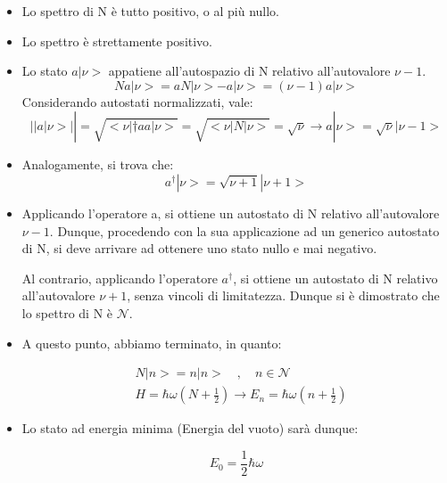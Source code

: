 \documentclass{article}
\begin{document}
\begin{itemize}
    \item Lo spettro di N è tutto positivo, o al più nullo.
    \item Lo spettro è strettamente positivo.
    \item Lo stato $a|\nu>$ appatiene all'autospazio di N relativo all'autovalore $\nu-1$.
          \begin{equation}
              Na|\nu>=aN|\nu>-a|\nu>=(\nu-1)a|\nu>
          \end{equation}
          Considerando autostati normalizzati, vale:
          \begin{equation}
              ||a|\nu>||= \sqrt{<\nu|\dagger a a|\nu>}=\sqrt{<\nu|N|\nu>}=\sqrt{\nu} \rightarrow a|\nu>=\sqrt{\nu}|\nu-1>
          \end{equation}
    \item Analogamente, si trova che:
          \begin{equation}
              a^{\dagger}|\nu>=\sqrt{\nu+1}|\nu+1>
          \end{equation}
    \item Applicando l'operatore a, si ottiene un autostato di N relativo all'autovalore $\nu-1$. Dunque,
          procedendo con la sua applicazione ad un generico autostato di N, si deve arrivare ad ottenere uno stato nullo e mai negativo.

          Al contrario, applicando l'operatore $a^{\dagger}$, si ottiene un autostato di N relativo all'autovalore $\nu+1$, senza vincoli di limitatezza.
          Dunque si è dimostrato che lo spettro di N è $\mathcal{N}$.
    \item A questo punto, abbiamo terminato, in quanto:

          \begin{equation}
              \begin{aligned}
                   & N |n>=n|n> \quad , \quad n \in \mathcal{N}                                \\
                   & H= \hbar\omega(N+\frac{1}{2}) \rightarrow E_n= \hbar\omega(n+\frac{1}{2})
              \end{aligned}
          \end{equation}
    \item Lo stato ad energia minima (Energia del vuoto) sarà dunque:

          \begin{equation}
              E_0=\frac{1}{2}\hbar \omega
          \end{equation}
\end{itemize}
\end{document}
